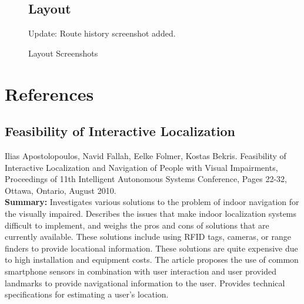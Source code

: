 \documentclass{scrreprt}
\begin{document}
\begin{figure}[ht!]

\section{Layout}
     \begin{center}
%
        
        \begin{highlightbox}
        	Update: Route history screenshot added.
        \end{highlightbox}
%
    \end{center}
    \caption{%
        Layout Screenshots
     }%
   \label{fig:subfigures}
\end{figure}
	
\chapter{References}

\section{Feasibility of Interactive Localization}
Ilias Apostolopoulos, Navid Fallah, Eelke Folmer, Kostas Bekris. Feasibility of Interactive Localization and Navigation of People with Visual Impairments, Proceedings of 11th Intelligent Autonomous Systems Conference, Pages 22-32, Ottawa, Ontario, August 2010.\\
 
 \textbf{Summary:}
Investigates various solutions to the problem of indoor navigation for the visually impaired. Describes the issues that make indoor localization systems difficult to implement, and weighs the pros and cons of solutions that are currently available. These solutions include using RFID tags, cameras, or range finders to provide locational information. These solutions are quite expensive due to high installation and equipment costs. The article proposes the use of common smartphone sensors in combination with user interaction and user provided landmarks to provide navigational information to the user. Provides technical specifications for estimating a user’s location.
 
\end{document}
